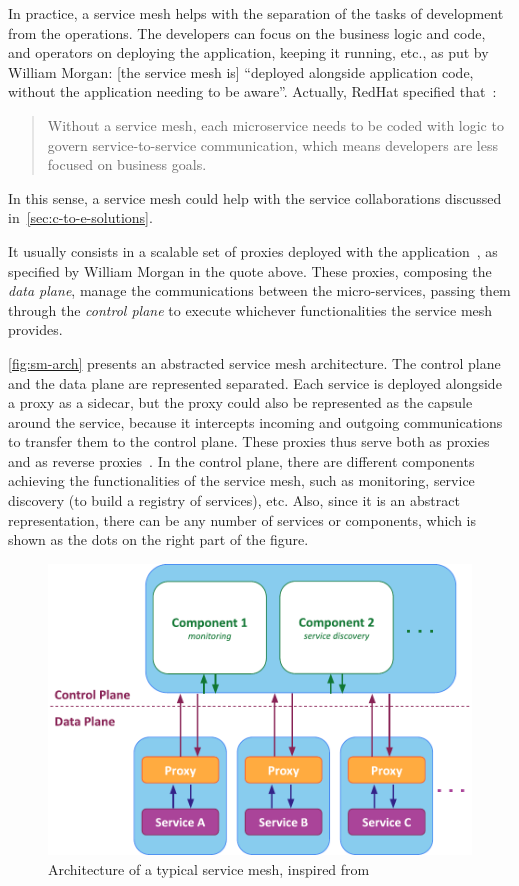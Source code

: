 In practice, a service mesh helps with the separation of the tasks of
development from the operations.
%
The developers can focus on the business logic and code, and operators
on deploying the application, keeping it running, etc., as put by
William Morgan: [the service mesh is] ``deployed alongside application
code, without the application needing to be aware''.
%
Actually, RedHat specified that~\cite{redhat-sm}:
\begin{quote}
  Without a service mesh, each microservice needs to be coded with
  logic to govern service-to-service communication, which means
  developers are less focused on business goals.
\end{quote}
%
In this sense, a service mesh could help with the service
collaborations discussed in~\autoref{sec:c-to-e-solutions}.


It usually consists in a scalable set of proxies deployed with the
application~\cite{linkerd-sm}, as specified by William Morgan in the quote above.
%
These proxies, composing the \emph{data plane}, manage the
communications between the micro-services, passing them through the
\emph{control plane} to execute whichever functionalities the service
mesh provides.

\autoref{fig:sm-arch} presents an abstracted service mesh
architecture.
%
The control plane and the data plane are represented
separated.
%
Each service is deployed alongside a proxy as a sidecar,
but the proxy could also be represented as the capsule around the
service, because it intercepts incoming and outgoing communications to
transfer them to the control plane.
%
These proxies thus serve both as proxies and as reverse
proxies~\cite{rproxy}.
%
In the control plane, there are different components achieving the
functionalities of the service mesh, such as monitoring, service
discovery (to build a registry of services), etc.
%
Also, since it is an abstract representation, there can be any number
of services or components, which is shown as the dots on the right
part of the figure.

\begin{figure}[htbp]
  \centering  \includegraphics[width=0.75\linewidth]{figs/pdf/service-mesh}
  \caption{Architecture of a typical service mesh, inspired from \cite{SMmanifesto}}
  \label{fig:sm-arch}
\end{figure}


